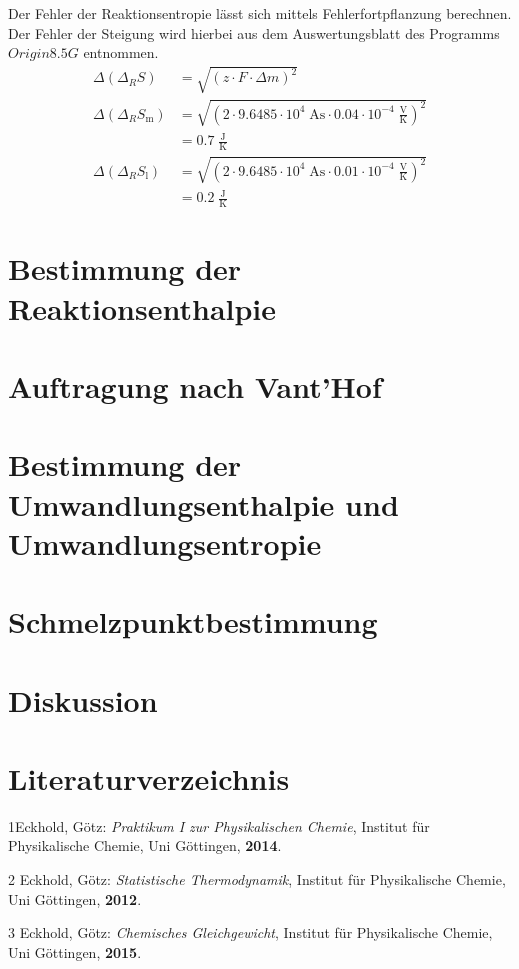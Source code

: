 \documentclass[12pt,a4paper,titlepage,headinclude,bibtotoc]{scrartcl}
\begin{document}
Der Fehler der Reaktionsentropie lässt sich mittels Fehlerfortpflanzung berechnen. Der Fehler der Steigung wird hierbei aus dem Auswertungsblatt des Programms $Origin 8.5 G$ entnommen. 
\begin{align}
\Delta(\Delta_R  S)&= \sqrt{(z\cdot F \cdot \Delta m)^2}\\
\Delta(\Delta_R  S_{\text{m}})&= \sqrt{(2\cdot 9.6485 \cdot 10^4\;\text{As} \cdot 0.04 \cdot 10^{-4}\;\frac{\text{V}}{\text{K}})^2}\\
&= 0.7 \;\frac{\text{J}}{\text{K}}\\
\Delta(\Delta_R  S_{\text{l}})&= \sqrt{(2\cdot 9.6485 \cdot 10^4\;\text{As} \cdot 0.01\cdot 10^{-4}\;\frac{\text{V}}{\text{K}})^2}\\
&= 0.2\;\frac{\text{J}}{\text{K}}
\end{align}
\section{Bestimmung der Reaktionsenthalpie}
\section{Auftragung nach Vant'Hof}
\section{Bestimmung der Umwandlungsenthalpie und Umwandlungsentropie}
\section{Schmelzpunktbestimmung}
\section{Diskussion}
\newpage
\section{Literaturverzeichnis}
1\quad Eckhold, Götz: \emph{Praktikum I zur Physikalischen Chemie}, Institut für Physikalische Chemie, Uni Göttingen, \textbf{2014}.

\vspace{0,5 cm}
2 \quad Eckhold, Götz: \emph{Statistische Thermodynamik}, Institut für Physikalische Chemie, Uni Göttingen, \textbf{2012}.

\vspace{0,5cm}
3 \quad Eckhold, Götz: \emph{Chemisches Gleichgewicht}, Institut für Physikalische Chemie, Uni Göttingen, \textbf{2015}.\\
\end{document}
